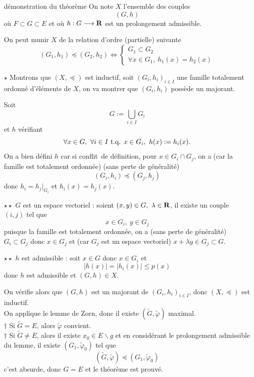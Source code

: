 \documentclass[a4paper,11pt, twoside]{article}
\begin{document}
\begin{Proof}{démonstration du théorème}
  On note $X$ l'ensemble des couples
  $$(G,h)$$
  où $F\subset G\subset E$ et où $h:G\longrightarrow \mathbf R$ est un prolongement admissible.

  On peut munir $X$ de la relation d'ordre (partielle) suivante 
  $$(G_1,h_1)\preccurlyeq(G_2,h_2)\Leftrightarrow\begin{cases}
    G_1\subset G_2\\
    \forall x\in G_1,\ h_1(x)=h_2(x)
  \end{cases}$$

  $\star$ Montrons que $(X,\preccurlyeq)$ est inductif, soit $(G_i,h_i)_{i\in I}$ une famille totalement ordonné d'éléments de $X$, on va montrer que $(G_i,h_i)$ possède un majorant.

  Soit 
  $$G:=\bigcup_{i\in I}G_i$$
  et $h$ vérifiant 
  $$\forall x\in G,\ \forall i\in I\text{ t.q. } x\in G_i,\ h(x):=h_i(x).$$
  On a bien défini $h$ car si \og conflit\fg\ de définition, pour $x\in G_i\cap G_j$, on a (car la famille est totalement ordonnée) (sans perte de généralité)
  $$(G_i,h_i)\preccurlyeq(G_j,h_j)$$
  donc $h_i=h_j\big|_{G_i}$ et $h_i(x)=h_j(x).$

  $\star\star$ $G$ est un espace vectoriel : soient $(x,y)\in G,\ \lambda\in \R$, il existe un couple $(i,j)$ tel que 
  $$x\in G_i,\ y\in G_j$$
  puisque la famille est totalement ordonnée, on a (sans perte de généralité) $G_i\subset G_j$ donc $x\in G_j$ et (car $G_j$ est un espace vectoriel) $x+\lambda y\in G_j\subset G.$

  $\star\star$ $h$ est admissible : soit $x\in G$ donc $x\in G_i$ et 
  $$|h(x)|=|h_i(x)|\leqslant p(x)$$
  donc $h$ est admissible et $(G,h)\in X$.

  On vérifie alors que $(G,h)$ est un majorant de $(G_i,h_i)_{i\in I}$, donc $(X,\preccurlyeq)$ est inductif.\\

  On applique le lemme de Zorn, donc il existe $(\tilde G,\tilde\varphi)$ maximal.\\

  $\dagger$ Si $\tilde G=E$, alors $\tilde\varphi$ convient.\\

  $\dagger$ Si $\tilde G\neq E$, alors il existe $x_0\in E\backslash g$ et en considérant le prolongement admissible du lemme, il existe $(G_1, \tilde\varphi_0)$ tel que 
  $$(\tilde G,\tilde\varphi)\preccurlyeq(G_1, \tilde\varphi_0)$$
  c'est absurde, donc $G=E$ et le théorème est prouvé.
\end{Proof}
\end{document}
